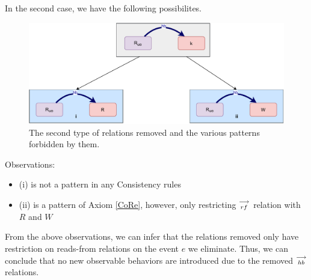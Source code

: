         In the second case, we have the following possibilites.
        \begin{figure}[H]
            \centering
            \includegraphics[scale=0.5]{6.Elimination/1.ValidEliminationCandidate/ReadElimProof/ProofParts/Part4_Case2.pdf}
            \caption{The second type of relations removed and the various patterns forbidden by them.}
        \end{figure}

        Observations:
        \begin{itemize}
            \item (i) is not a pattern in any Consistency rules
            \item (ii) is a pattern of Axiom \ref{CoRe}, however, only restricting $\stackrel{\longrightarrow}{_{rf}}$ relation with $R$ and $W$
        \end{itemize}

        From the above observations, we can infer that the relations removed only have restriction on reads-from relations on the event $e$ we eliminate. Thus, we can conclude that no new observable behaviors are introduced due to the removed $\stackrel{\longrightarrow}{_{hb}}$ relations. 